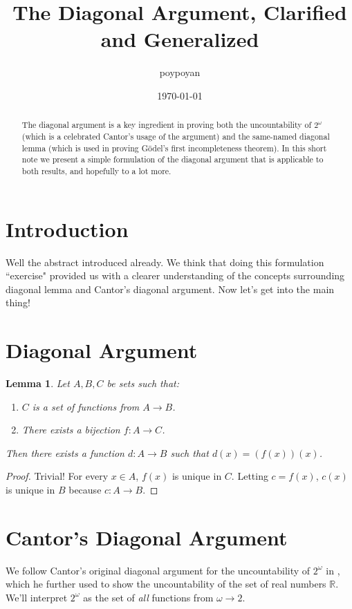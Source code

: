 \documentclass{article}
\title{The Diagonal Argument, Clarified and Generalized}
\author{poypoyan}
\date{\petsa\today}
\newtheorem{lemma}[theorem]{Lemma}
\begin{document}
\maketitle

\begin{abstract}
The diagonal argument is a key ingredient in proving both the uncountability of $2^{\omega}$ (which is a celebrated Cantor's usage of the argument) and the same-named diagonal lemma (which is used in proving Gödel's first incompleteness theorem). In this short note we present a simple formulation of the diagonal argument that is applicable to both results, and hopefully to a lot more.
\end{abstract}

\section{Introduction}
Well the abstract introduced already. We think that doing this formulation ``exercise" provided us with a clearer understanding of the concepts surrounding diagonal lemma and Cantor's diagonal argument. Now let's get into the main thing!

\section{Diagonal Argument}
\begin{lemma}\label{diag-arg}
Let $A, B, C$ be sets such that:
\begin{enumerate}
	\item $C$ is a set of functions from $A \rightarrow B$.
	\item There exists a bijection $f:A \rightarrow C$.
\end{enumerate}
Then there exists a function $d:A \rightarrow B$ such that $d(x) = (f(x))(x)$.
\end{lemma}
\begin{proof}
Trivial! For every $x \in A$, $f(x)$ is unique in $C$. Letting $c = f(x)$, $c(x)$ is unique in $B$ because $c:A \rightarrow B$.
\end{proof}

\section{Cantor's Diagonal Argument}
We follow Cantor's original diagonal argument for the uncountability of $2^{\omega}$ in \cite{cantor}, which he further used to show the uncountability of the set of real numbers $\mathbb{R}$. We'll interpret $2^{\omega}$ as the set of \textit{all} functions from $\omega \rightarrow 2$.
\end{document}
